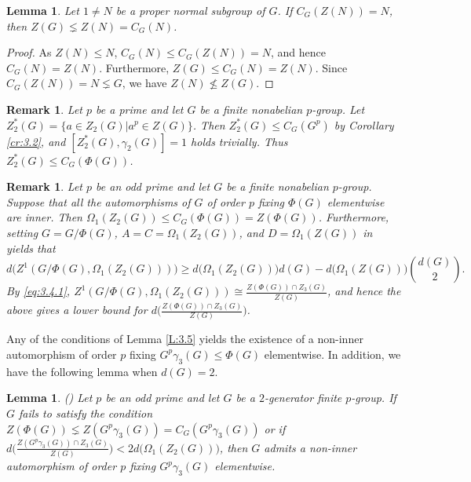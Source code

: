\documentclass[preprint,sort&compress,12pt]{elsarticle}
\newtheorem{lemma}[theorem]{Lemma}
\newtheorem{remark}[theorem]{Remark}
\theoremstyle{definition}
\numberwithin{equation}{theorem}
\begin{document}
\begin{lemma}\label{L:3.6}
Let $1\neq N$ be a proper normal subgroup of $G$. If $C_G(Z(N))=N$, then $Z(G)\lneq Z(N)=C_G(N)$.
\end{lemma}

\begin{proof}
As $Z(N)\le N$, $C_G(N)\le C_G(Z(N))=N$, and hence $C_G(N)=Z(N)$. Furthermore, $Z(G)\le C_G(N)=Z(N)$. Since $C_G(Z(N))=N\lneq G$, we have $Z(N)\not\le Z(G)$.
\end{proof}

\begin{remark}\label{R:3.7}
Let $p$ be a prime and let $G$ be a finite nonabelian $p$-group. Let $Z_2^*(G)=\{a\in Z_2(G)| a^p\in Z(G)\}$. Then $Z_2^*(G)\le C_G(G^p)$ by Corollary \ref{cr:3.2}, and $[Z_2^*(G), \gamma_2(G)]=1$ holds trivially. Thus $Z_2^*(G)\le C_G(\Phi(G))$.
\end{remark}

\begin{remark}\label{R:3.8}
Let $p$ be an odd prime and let $G$ be a finite nonabelian $p$-group. Suppose that all the automorphisms of $G$ of order $p$ fixing $\Phi(G)$ elementwise are inner. Then $\Omega_1(Z_2(G))\le C_G(\Phi(G))=Z(\Phi(G))$. Furthermore, setting $G=G/\Phi(G)$, $A=C=\Omega_1(Z_2(G))$, and $D=\Omega_1(Z(G))$ in \cite[Lemma\ 2.3]{AGW13} yields that
\begin{equation*}
d\big(Z^1(G/\Phi(G), \Omega_1(Z_2(G)))\big)\ge d\big(\Omega_1(Z_2(G))\big)d(G)- d\big(\Omega_1(Z(G))\big) {{d(G)}\choose{2}}.
\end{equation*}
\noindent By \eqref{eq:3.4.1}, $Z^1(G/\Phi(G), \Omega_1(Z_2(G)))\cong \frac{Z(\Phi(G))\cap Z_3(G)}{Z(G)}$, and hence the above gives a lower bound for $d\bigg(\frac{Z(\Phi(G))\cap Z_3(G)}{Z(G)}\bigg)$.
\end{remark}

Any of the conditions of Lemma \ref{L:3.5} yields the existence of a non-inner automorphism of order $p$ fixing $G^p\gamma_3(G)\le \Phi(G)$ elementwise. In addition, we have the following lemma when $d(G)=2$.
\begin{lemma}\label{L:3.9}(\cite[Theorem\ 1]{AG17})
Let $p$ be an odd prime and let $G$ be a $2$-generator finite $p$-group. If $G$ fails to satisfy the condition $Z(\Phi(G))\lneq Z(G^p\gamma_3(G))= C_G(G^p\gamma_3(G))$ or if $d\bigg(\frac{Z(G^p\gamma_3(G))\cap Z_3(G)}{Z(G)}\bigg)< 2d\big(\Omega_1(Z_2(G))\big)$, then $G$ admits a non-inner automorphism of order $p$ fixing $G^p\gamma_3(G)$ elementwise.
\end{lemma}
\end{document}
